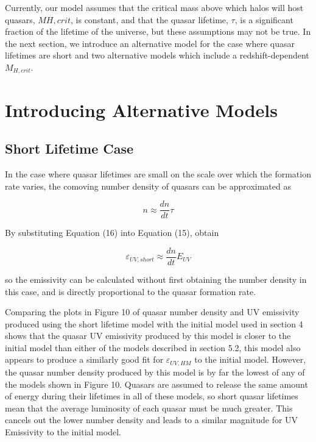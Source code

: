 \documentclass[12pt, twocolumn]{report}%
\begin{document}
\twocolumngrid


Currently, our model assumes that the critical mass above which halos will host quasars, $M{H,crit}$, is constant, and that the quasar lifetime, $\tau$, is a significant fraction of the lifetime of the universe, but these assumptions may not be true. In the next section, we introduce an alternative model for the case where quasar lifetimes are short and two alternative models which include a redshift-dependent $M_{H,crit}$.

\section{Introducing Alternative Models}

\subsection{Short Lifetime Case}

In the case where quasar lifetimes are small on the scale over which the formation rate varies, the comoving number density of quasars can be approximated as

\begin{equation}
    n\approx\frac{dn}{dt}\tau
\end{equation}

\noindent By substituting Equation (16) into Equation (15), obtain

\begin{equation}
    \varepsilon_{UV,short}\approx\frac{dn}{dt}E_{UV}
\end{equation}

\noindent so the emissivity can be calculated without first obtaining the number density in this case, and is directly proportional to the quasar formation rate.\par

Comparing the plots in Figure 10 of quasar number density and UV emissivity produced using the short lifetime model with the initial model used in section 4 shows that the quasar UV emissivity produced by this model is closer to the initial model than either of the models described in section 5.2, this model also appears to produce a similarly good fit for $\varepsilon_{UV,HM}$ to the initial model. However, the quasar number density produced by this model is by far the lowest of any of the models shown in Figure 10. Quasars are assumed to release the same amount of energy during their lifetimes in all of these models, so short quasar lifetimes mean that the average luminosity of each quasar must be much greater. This cancels out the lower number density and leads to a similar magnitude for UV Emissivity to the initial model.
\end{document}
